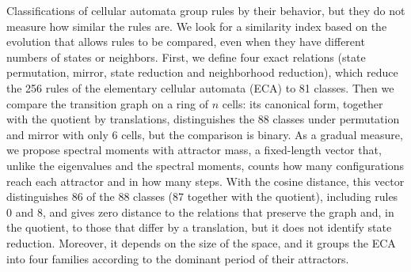Classifications of cellular automata group rules by their behavior, but they do not measure how similar the rules are. We look for a similarity index based on the evolution that allows rules to be compared, even when they have different numbers of states or neighbors. First, we define four exact relations (state permutation, mirror, state reduction and neighborhood reduction), which reduce the 256 rules of the elementary cellular automata (ECA) to 81 classes. Then we compare the transition graph on a ring of $n$ cells: its canonical form, together with the quotient by translations, distinguishes the 88 classes under permutation and mirror with only 6 cells, but the comparison is binary. As a gradual measure, we propose spectral moments with attractor mass, a fixed-length vector that, unlike the eigenvalues and the spectral moments, counts how many configurations reach each attractor and in how many steps. With the cosine distance, this vector distinguishes 86 of the 88 classes (87 together with the quotient), including rules 0 and 8, and gives zero distance to the relations that preserve the graph and, in the quotient, to those that differ by a translation, but it does not identify state reduction. Moreover, it depends on the size of the space, and it groups the ECA into four families according to the dominant period of their attractors.
